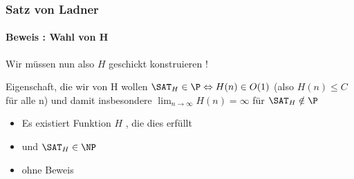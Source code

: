 \begin{frame}
	\frametitle{Satz von Ladner}
	\framesubtitle{Beweis : Wahl von H}
	Wir müssen nun also $H$ geschickt konstruieren !
	\pause
	\begin{KITblock}{Eigenschaft, die wir von H wollen}
		${\SAT}_H \in \P \Leftrightarrow H(n) \in O(1)$ (also $H(n) \leq C$ f\"ur alle n) 				\newline
		und damit insbesondere $\lim_{n \to \infty}  H(n) = \infty$ f\"ur ${\SAT}_H
		\notin \P$
	\end{KITblock}
	\bigskip
	\pause
	\begin{itemize}
	  \item Es existiert Funktion $H$ , die dies erfüllt
	  \item und ${\SAT}_H \in \NP$
	  \item ohne Beweis
	\end{itemize}
		
\end{frame}
% 	

